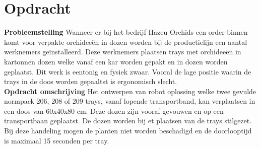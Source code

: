 \section{Opdracht}
	\textbf{Probleemstelling}
	Wanneer er bij het bedrijf Hazeu Orchids een order binnen komt voor verpakte orchideeën in dozen worden bij de productielijn een aantal werknemers geïnstalleerd. Deze werknemers plaatsen trays met orchideeën in kartonnen dozen welke vanaf een kar worden gepakt en in dozen worden geplaatst. Dit werk is eentonig en fysiek zwaar. Vooral de lage positie waarin de trays in de doos worden gepaaltst is ergonomisch slecht.\\[0.5cm]
	
	
	\textbf{Opdracht omschrijving}
	Het ontwerpen van robot oplossing welke twee gevulde normpack  206, 208 of 209 trays, vanaf lopende transportband, kan verplaatsen in een doos van 60x40x80 cm. Deze dozen zijn vooraf gevouwen en op een transportbaan geplaatst. De dozen worden bij et plaatsen van de trays stilgezet. Bij deze handeling mogen de planten niet worden beschadigd en de doorlooptijd is maximaal 15 seconden per tray.
	
	
\newpage